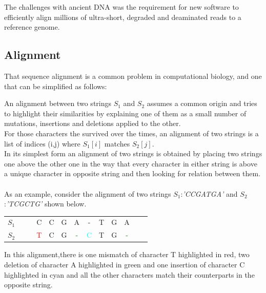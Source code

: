\documentclass[11pt,a4paper]{report}
\begin{document}
The challenges with ancient DNA was the requirement for new software to efficiently 
align millions of ultra-short, degraded and deaminated reads to a reference genome.


\subsection{Alignment}


That sequence alignment is a common problem in computational biology, and one that can be simplified as follows:

An alignment between two strings $S_{1}$ and $S_{2}$ assumes a common origin and 
tries to highlight their similarities by explaining one of them as a small number 
of mutations, insertions and deletions applied to the other.\\

For those characters the survived over the times, an alignment of two strings is a list of indices (i,j) where $S_{1}[i]$ matches $S_{2}[j]$.\\ 
In its simplest form an alignment of two strings is obtained by placing two strings one above 
the other one in the way that every character in either string is above a unique character 
in opposite string and then looking for relation between them.\\\\
As an example, consider the alignment of two strings $S_{1}$:\emph{'CCGATGA'} and $S_{2}$:\emph{'TCGCTG'} shown below. 

\begin{center}
	\begin{tabular}{ c c c |c| c c |c|c| c c|c| c c}
   $S_{1}$   &  & & C & C & G & A & - & T & G & A && \\
$S_{2}$ 	&  & &{\textcolor{red}T}& C & G & {\textcolor{green}-}& {\textcolor{cyan}C }  &  T & G & {\textcolor{green}- }& \\
    	                                 
	\end{tabular}
\end{center} 
In this alignment,there is one mismatch of character T highlighted in red, 
two deletion of character A highlighted in green and one insertion of character
C highlighted in cyan and all the other characters match their counterparts in the opposite string. 
\\\\
\end{document}
